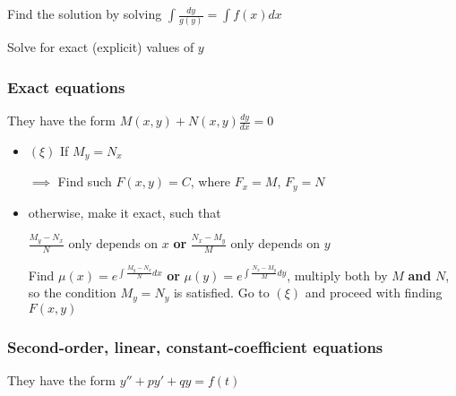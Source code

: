\documentclass[12pt]{article}
\begin{document}
Find the solution by solving \(\int \frac{dy}{g(y)} = \int f(x) dx\)

Solve for exact (explicit) values of \(y\)

\subsubsection*{Exact equations}
\label{sec:org01c65a5}
They have the form \(M(x,y) + N(x,y) \frac{dy}{dx} = 0\)

\begin{itemize}
\item \((\xi)\) If \(M_y = N_x\)

\(\implies\) Find such \(F(x,y)=C\), where \(F_x = M\), \(F_y = N\)

\item otherwise, make it exact, such that

\(\frac{M_y-N_x}{N}\) only depends on \(x\) \textbf{or} \(\frac{N_x-M_y}{M}\) only
depends on \(y\) 

Find \(\mu(x) = e^{\int \frac{M_y-N_x}{N} dx}\) \textbf{or}
\(\mu(y) = e^{\int \frac{N_x-M_y}{M} dy}\), multiply both by \(M\) \textbf{and} \(N\),
so the condition \(M_y = N_y\) is satisfied. Go to \((\xi)\) and proceed with
finding \(F(x,y)\)
\end{itemize}

\subsubsection*{Second-order, linear, constant-coefficient equations}
\label{sec:org53ffa35}
They have the form \(y'' + p y' + q y = f(t)\)
\end{document}
